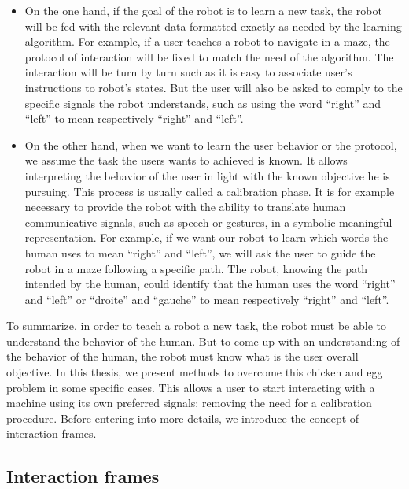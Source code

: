 \begin{itemize}

\item On the one hand, if the goal of the robot is to learn a new task, the robot will be fed with the relevant data formatted exactly as needed by the learning algorithm. For example, if a user teaches a robot to navigate in a maze, the protocol of interaction will be fixed to match the need of the algorithm. The interaction will be turn by turn such as it is easy to associate user's instructions to robot's states. But the user will also be asked to comply to the specific signals the robot understands, such as using the word ``right'' and ``left'' to mean respectively ``right'' and ``left''.

\item On the other hand, when we want to learn the user behavior or the protocol, we assume the task the users wants to achieved is known. It allows interpreting the behavior of the user in light with the known objective he is pursuing. This process is usually called a calibration phase. It is for example necessary to provide the robot with the ability to translate human communicative signals, such as speech or gestures, in a symbolic meaningful representation. For example, if we want our robot to learn which words the human uses to mean ``right'' and ``left'', we will ask the user to guide the robot in a maze following a specific path. The robot, knowing the path intended by the human, could identify that the human uses the word ``right'' and ``left'' or ``droite'' and ``gauche'' to mean respectively ``right'' and ``left''.

\end{itemize}

To summarize, in order to teach a robot a new task, the robot must be able to understand the behavior of the human. But to come up with an understanding of the behavior of the human, the robot must know what is the user overall objective. In this thesis, we present methods to overcome this chicken and egg problem in some specific cases. This allows a user to start interacting with a machine using its own preferred signals; removing the need for a calibration procedure. Before entering into more details, we introduce the concept of interaction frames.

\subsection{Interaction frames}

